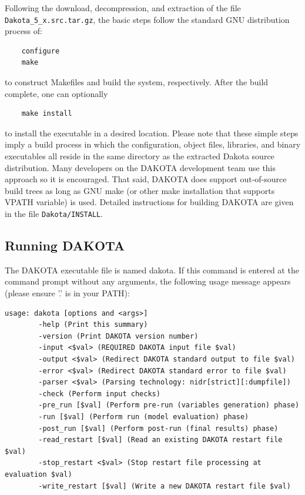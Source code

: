Following the download, decompression, and extraction of the file
\texttt{Dakota\_5\_x.src.tar.gz}, the basic steps follow the standard
GNU distribution process of:
\begin{small}
\begin{verbatim}
    configure
    make
\end{verbatim}
\end{small}
to construct Makefiles and build the system, respectively.  After the build
complete, one can optionally
\begin{small}
\begin{verbatim}
    make install
\end{verbatim}
\end{small}
to install the executable in a desired location.  Please note that these
simple steps imply a build process in which the configuration, object files,
libraries, and binary executables all reside in the same directory as the
extracted Dakota source distribution.  Many developers on the DAKOTA
development team use this approach so it is encouraged.  That said, DAKOTA
does support out-of-source build trees as long as GNU make (or other make
installation that supports VPATH variable) is used.  Detailed instructions
for building DAKOTA are given in the file
\texttt{Dakota/INSTALL}.

\subsection{Running DAKOTA}\label{tutorial:installation:running}

The DAKOTA executable file is named dakota. If this command is entered
at the command prompt without any arguments, the following usage message
appears (please ensure '.' is in your PATH):
\begin{small}
\begin{verbatim}
usage: dakota [options and <args>]
        -help (Print this summary)
        -version (Print DAKOTA version number)
        -input <$val> (REQUIRED DAKOTA input file $val)
        -output <$val> (Redirect DAKOTA standard output to file $val)
        -error <$val> (Redirect DAKOTA standard error to file $val)
        -parser <$val> (Parsing technology: nidr[strict][:dumpfile])
        -check (Perform input checks)
        -pre_run [$val] (Perform pre-run (variables generation) phase)
        -run [$val] (Perform run (model evaluation) phase)
        -post_run [$val] (Perform post-run (final results) phase)
        -read_restart [$val] (Read an existing DAKOTA restart file $val)
        -stop_restart <$val> (Stop restart file processing at evaluation $val)
        -write_restart [$val] (Write a new DAKOTA restart file $val)
\end{verbatim}
\end{small}

